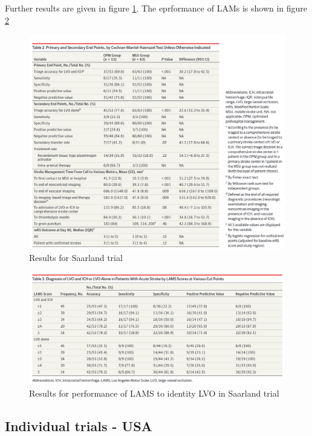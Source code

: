 Further results are given in figure \ref{fig:helwig_2019}. The eprformance of LAMs is shown in figure \ref{fig:helwig_lams}

\begin{figure}
    \centering
    \includegraphics[width=0.95\linewidth]{images_background/helwig_2019.png}
    \caption{Results for Saarland trial \cite{helwig_prehospital_2019}}
    \label{fig:helwig_2019}
\end{figure}

\begin{figure}
    \centering
    \includegraphics[width=0.95\linewidth]{images_background/helwig_lams.png}
    \caption{Results for performance of LAMS to identity LVO in Saarland trial \cite{helwig_prehospital_2019}}
    \label{fig:helwig_lams}
\end{figure}


\subsection{Individual trials - USA}


